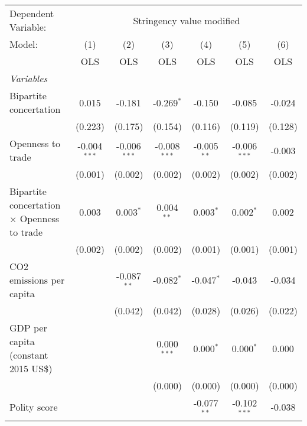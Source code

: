 
\begingroup
\centering
\begin{tabular}{lcccccc}
   \toprule
   Dependent Variable: & \multicolumn{6}{c}{Stringency value modified}\\
   Model:                                             & (1)            & (2)            & (3)            & (4)           & (5)            & (6)\\  
                                                      &  OLS           & OLS            & OLS            & OLS           & OLS            & OLS\\  
   \midrule
   \emph{Variables}\\
   Bipartite concertation                             & 0.015          & -0.181         & -0.269$^{*}$   & -0.150        & -0.085         & -0.024\\   
                                                      & (0.223)        & (0.175)        & (0.154)        & (0.116)       & (0.119)        & (0.128)\\   
   Openness to trade                                  & -0.004$^{***}$ & -0.006$^{***}$ & -0.008$^{***}$ & -0.005$^{**}$ & -0.006$^{***}$ & -0.003\\   
                                                      & (0.001)        & (0.002)        & (0.002)        & (0.002)       & (0.002)        & (0.002)\\   
   Bipartite concertation $\times$ Openness to trade  & 0.003          & 0.003$^{*}$    & 0.004$^{**}$   & 0.003$^{*}$   & 0.002$^{*}$    & 0.002\\   
                                                      & (0.002)        & (0.002)        & (0.002)        & (0.001)       & (0.001)        & (0.001)\\   
   CO2 emissions per capita                           &                & -0.087$^{**}$  & -0.082$^{*}$   & -0.047$^{*}$  & -0.043         & -0.034\\   
                                                      &                & (0.042)        & (0.042)        & (0.028)       & (0.026)        & (0.022)\\   
   GDP per capita (constant 2015 US\$)                &                &                & 0.000$^{***}$  & 0.000$^{*}$   & 0.000$^{*}$    & 0.000\\   
                                                      &                &                & (0.000)        & (0.000)       & (0.000)        & (0.000)\\   
   Polity score                                       &                &                &                & -0.077$^{**}$ & -0.102$^{***}$ & -0.038\\   

\end{tabular}
